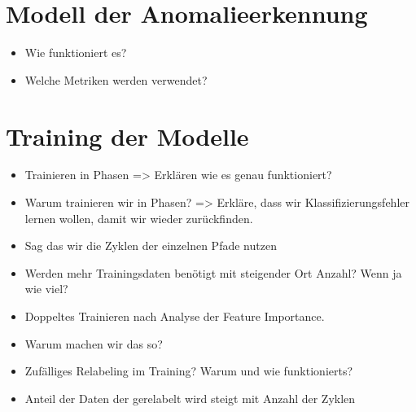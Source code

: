 \section{Modell der Anomalieerkennung}
\begin{itemize}
    \item Wie funktioniert es?
    \item Welche Metriken werden verwendet?
\end{itemize}

\section{Training der Modelle}
\begin{itemize}
    \item Trainieren in Phasen => Erklären wie es genau funktioniert?
    \item Warum trainieren wir in Phasen? => Erkläre, dass wir Klassifizierungsfehler lernen wollen, damit wir wieder zurückfinden.
    \item Sag das wir die Zyklen der einzelnen Pfade nutzen
    \item Werden mehr Trainingsdaten benötigt mit steigender Ort Anzahl? Wenn ja wie viel?
    \item Doppeltes Trainieren nach Analyse der Feature Importance.
    \item Warum machen wir das so?
    \item Zufälliges Relabeling im Training? Warum und wie funktionierts?
    \item Anteil der Daten der gerelabelt wird steigt mit Anzahl der Zyklen
\end{itemize}
